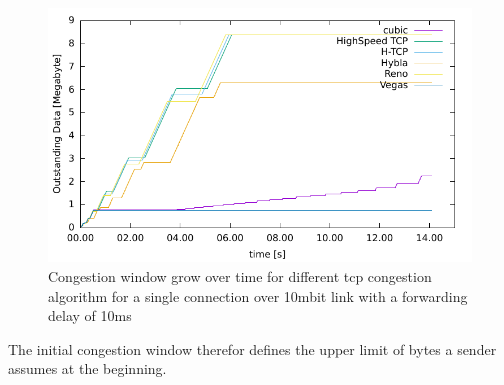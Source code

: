 \begin{figure}[ht]
\footnotesize
\includegraphics[scale=0.8]{figure/b2a_owin.pdf}
\caption{Congestion window grow over time for different tcp congestion
algorithm for a single connection over 10mbit link with a forwarding delay of
10ms}
\label{fig:cwnd_tcp_algos}
\end{figure}

The initial congestion window therefor defines the upper limit of bytes a sender assumes at
the beginning.
